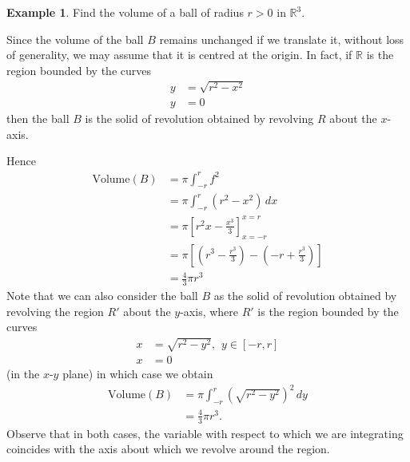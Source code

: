 \documentclass[11pt]{article}
\theoremstyle{definition}
\newtheorem{exmp}[thm]{Example}
\newcommand{\mbR}{\ensuremath{\mathbb{R}}}
\begin{document}
\begin{exmp}
Find the volume of a ball of radius $r > 0$ in $\mbR^3$. 

Since the volume of the ball $B$ remains unchanged if we translate it, without loss of generality, we may assume that it is centred at the origin. In fact, if $\mbR$ is the region bounded by the curves
\begin{align*}
y & = \sqrt{r^2 - x^2} \\ y & = 0
\end{align*}
then the ball $B$ is the solid of revolution obtained by revolving $R$ about the $x$-axis. 

Hence
\begin{align*}
\text{Volume}(B) 
& = \pi \int_{-r}^r f^2 \\
& = \pi \int_{-r}^r (r^2 - x^2)\,dx \\
& = \pi \left[ r^2x - \frac{x^3}3\right]_{x=-r}^{x=r} \\
& = \pi \left[\left(r^3 - \frac{r^3}3\right) - \left(-r + \frac{r^3}3\right)\right] \\
& = \frac43\pi r^3
\end{align*}
Note that we can also consider the ball $B$ as the solid of revolution obtained by revolving the region $R'$ about the $y$-axis, where $R'$ is the region bounded by the curves 
\begin{align*}
x & = \sqrt{r^2 - y^2}, \hspace{5pt} y \in [-r, r] \\ x & = 0
\end{align*}
(in the $x$-$y$ plane) in which case we obtain
\begin{align*}
\text{Volume}(B) 
& = \pi \int_{-r}^r (\sqrt{r^2 - y^2})^2\,dy \\
& = \frac43\pi r^3 \text{.}
\end{align*}
Observe that in both cases, the variable with respect to which we are integrating coincides with the axis about which we revolve around the region.
\end{exmp}
\end{document}
